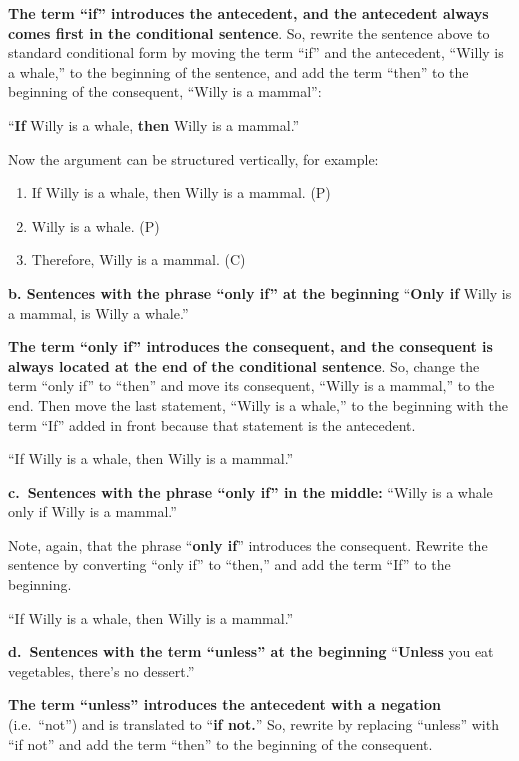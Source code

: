 \documentclass[
]{book}
\providecommand{\tightlist}{%
  \setlength{\itemsep}{0pt}\setlength{\parskip}{0pt}}
\begin{document}
\textbf{The term ``if'' introduces the antecedent, and the antecedent always comes first in the conditional sentence}. So, rewrite the sentence above to standard conditional form by moving the term ``if'' and the antecedent, ``Willy is a whale,'' to the beginning of the sentence, and add the term ``then'' to the beginning of the consequent, ``Willy is a mammal'':

``\textbf{If} Willy is a whale, \textbf{then} Willy is a mammal.''

Now the argument can be structured vertically, for example:

\begin{enumerate}
\def\labelenumi{\arabic{enumi}.}
\tightlist
\item
  If Willy is a whale, then Willy is a mammal. (P)\\
\item
  Willy is a whale. (P)\\
\item
  Therefore, Willy is a mammal. (C)
\end{enumerate}

\textbf{b. Sentences with the phrase ``only if'' at the beginning}
``\textbf{Only if} Willy is a mammal, is Willy a whale.''

\textbf{The term ``only if'' introduces the consequent, and the consequent is always located at the end of the conditional sentence}. So, change the term ``only if'' to ``then'' and move its consequent, ``Willy is a mammal,'' to the end. Then move the last statement, ``Willy is a whale,'' to the beginning with the term ``If'' added in front because that statement is the antecedent.

``If Willy is a whale, then Willy is a mammal.''

\textbf{c.~Sentences with the phrase ``only if'' in the middle:}
``Willy is a whale only if Willy is a mammal.''

Note, again, that the phrase ``\textbf{only if}'' introduces the consequent. Rewrite the sentence by converting ``only if'' to ``then,'' and add the term ``If'' to the beginning.

``If Willy is a whale, then Willy is a mammal.''

\textbf{d.~Sentences with the term ``unless'' at the beginning}
``\textbf{Unless} you eat vegetables, there's no dessert.''

\textbf{The term ``unless'' introduces the antecedent with a negation} (i.e.~``not'') and is translated to ``\textbf{if not.}'' So, rewrite by replacing ``unless'' with ``if not'' and add the term ``then'' to the beginning of the consequent.
\end{document}
